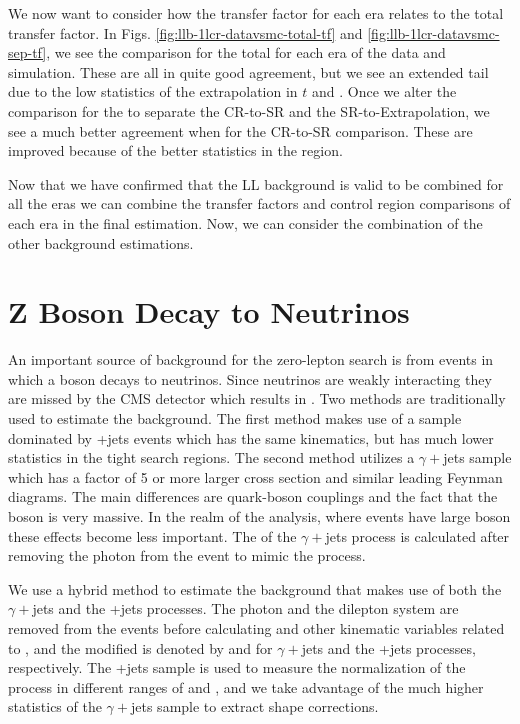 We now want to consider how the transfer factor for each era relates to the total transfer factor. In Figs. \ref{fig:llb-1lcr-datavsmc-total-tf} and \ref{fig:llb-1lcr-datavsmc-sep-tf}, we see the comparison for the total \tfll{} for each era of the data and simulation. These are all in quite good agreement, but we see an extended tail due to the low statistics of the extrapolation in $t$ and \W. Once we alter the comparison for the \tfll{} to separate the CR-to-SR and the SR-to-Extrapolation, we see a much better agreement when for the CR-to-SR comparison. These are improved because of the better statistics in the region. 






Now that we have confirmed that the LL background is valid to be combined for all the eras we can combine the transfer factors and control region comparisons of each era in the final estimation. Now, we can consider the combination of the other background estimations. 

\section{Z Boson Decay to Neutrinos}
\label{sec:Znunu}

An important source of background for the zero-lepton search is from events in which a \Z{} boson decays to neutrinos. Since neutrinos are weakly interacting they are missed by the CMS detector which results in \met. Two methods are traditionally used to estimate the \Znunu{} background. The first method makes use of a sample dominated by \Zll+jets events which has the same kinematics, but has much lower statistics in the tight search regions. The second method utilizes a $\gamma+$jets sample which has a factor of 5 or more larger cross section and similar leading Feynman diagrams. The main differences are quark-boson couplings and the fact that the \Z{} boson is very massive. In the realm of the analysis, where events have large boson \pt{} these effects become less important. The \met{} of the $\gamma+$jets process is calculated after removing the photon from the event to mimic the \Znunu{} process.

We use a hybrid method to estimate the \Znunu{} background that makes use of both the $\gamma+$jets and the \Zll+jets processes. The photon and the dilepton system are removed from the events before calculating \met{} and other kinematic variables related to \met, and the modified \met{} is denoted by \metgamma{} and \metll{} for $\gamma+$jets and the \Zll+jets processes, respectively. The \Zll+jets sample is used to measure the normalization of the \Znunu{} process in different ranges of \nb{} and \nsv, and we take advantage of the much higher statistics of the $\gamma+$jets sample to extract shape corrections. 

